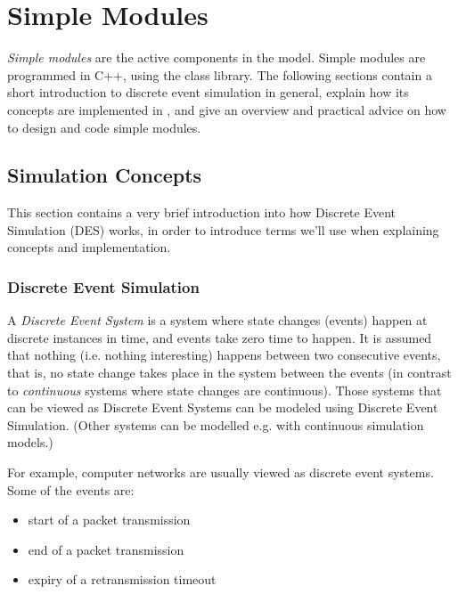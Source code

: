 \chapter{Simple Modules}
\label{cha:simple-modules}


\textit{Simple modules} are the active components in the model.
Simple modules are programmed in C++, using the {\opp} class
library. The following sections contain a short introduction
to discrete event simulation in general, explain how its concepts are
implemented in {\opp}, and give an overview and practical advice
on how to design and code simple modules.



\section{Simulation Concepts}
\label{sec:simple-modules:simulation-concepts}

This section contains a very brief introduction into how Discrete
Event Simulation (DES) works, in order to introduce terms we'll use
when explaining {\opp} concepts and
implementation.


\subsection{Discrete Event Simulation}
\label{sec:simple-modules:discrete-event-simulation}

A \textit{Discrete Event System} is a system where state changes
(events) happen at discrete instances in time, and events take zero time
to happen. It is assumed that nothing (i.e. nothing interesting)
happens between two consecutive events, that is, no state change takes
place in the system between the events (in contrast to
\textit{continuous} systems where state changes are continuous). Those
systems that can be viewed as Discrete Event Systems can be modeled
using Discrete Event Simulation.
(Other systems can be modelled e.g. with continuous simulation models.)

For example, computer networks are usually viewed as discrete
event systems. Some of the events are:

\begin{itemize}
  \item{start of a packet transmission}
  \item{end of a packet transmission}
  \item{expiry of a retransmission timeout}
\end{itemize}


